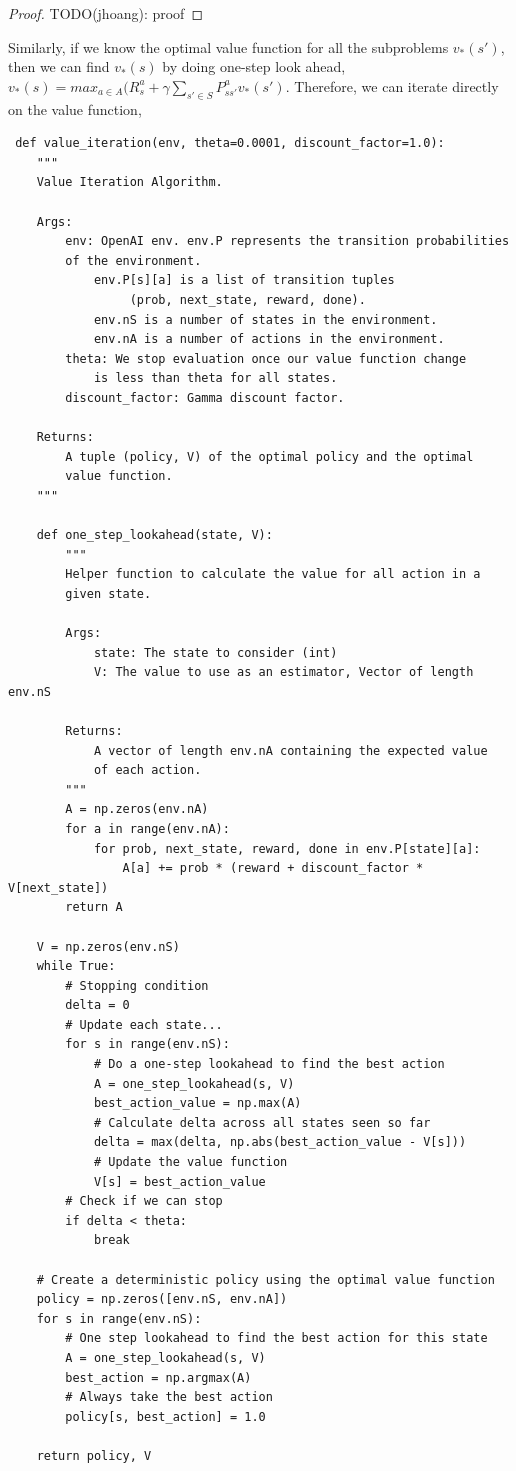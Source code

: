 \documentclass[graybox]{svmult}
\begin{document}
\begin{proof}
TODO(jhoang): proof
\end{proof}

Similarly, if we know the optimal value function for all the subproblems $v_{*}(s')$, then we can find $v_{*}(s)$ by doing one-step look ahead, $v_{*}(s) = max_{a \in A} (R^{a}_s + \gamma \sum_{s' \in S} P^a_{ss'} v_{*}(s')$. Therefore, we can iterate directly on the value function,

\begin{verbatim}
 def value_iteration(env, theta=0.0001, discount_factor=1.0):
    """
    Value Iteration Algorithm.

    Args:
        env: OpenAI env. env.P represents the transition probabilities 
        of the environment.
            env.P[s][a] is a list of transition tuples 
                 (prob, next_state, reward, done).
            env.nS is a number of states in the environment.
            env.nA is a number of actions in the environment.
        theta: We stop evaluation once our value function change 
            is less than theta for all states.
        discount_factor: Gamma discount factor.

    Returns:
        A tuple (policy, V) of the optimal policy and the optimal 
        value function.
    """

    def one_step_lookahead(state, V):
        """
        Helper function to calculate the value for all action in a 
        given state.

        Args:
            state: The state to consider (int)
            V: The value to use as an estimator, Vector of length env.nS

        Returns:
            A vector of length env.nA containing the expected value 
            of each action.
        """
        A = np.zeros(env.nA)
        for a in range(env.nA):
            for prob, next_state, reward, done in env.P[state][a]:
                A[a] += prob * (reward + discount_factor * V[next_state])
        return A

    V = np.zeros(env.nS)
    while True:
        # Stopping condition
        delta = 0
        # Update each state...
        for s in range(env.nS):
            # Do a one-step lookahead to find the best action
            A = one_step_lookahead(s, V)
            best_action_value = np.max(A)
            # Calculate delta across all states seen so far
            delta = max(delta, np.abs(best_action_value - V[s]))
            # Update the value function
            V[s] = best_action_value
        # Check if we can stop
        if delta < theta:
            break

    # Create a deterministic policy using the optimal value function
    policy = np.zeros([env.nS, env.nA])
    for s in range(env.nS):
        # One step lookahead to find the best action for this state
        A = one_step_lookahead(s, V)
        best_action = np.argmax(A)
        # Always take the best action
        policy[s, best_action] = 1.0

    return policy, V
\end{verbatim}
\end{document}
